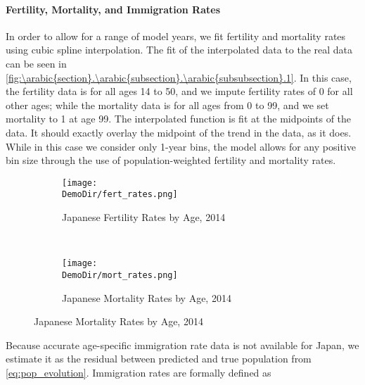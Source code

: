 \documentclass[10pt]{article}
\renewcommand{\thesection}{\arabic{section}}
\renewcommand{\thesubsection}{\thesection.\arabic{subsection}}
\renewcommand{\thesubsubsection}{\thesubsection.\arabic{subsubsection}}
\numberwithin{equation}{subsection}
\newcommand*{\DemoDir}{../../code/Rick/OUTPUT/Demographics}
\begin{document}
\begin{appendices}

\paragraph{Fertility, Mortality, and Immigration Rates}

\par In order to allow for a range of model years, we fit fertility and mortality rates using cubic spline interpolation. The fit of the interpolated data to the real data can be seen in \autoref{fig:\thesubsubsection.1}. In this case, the fertility data is for all ages 14 to 50, and we impute fertility rates of 0 for all other ages; while the mortality data is for all ages from 0 to 99, and we set mortality to 1 at age 99. The interpolated function is fit at the midpoints of the data. It should exactly overlay the midpoint of the trend in the data, as it does. While in this case we consider only 1-year bins, the model allows for any positive bin size through the use of population-weighted fertility and mortality rates.

\begin{figure}[H]
   \caption{\label{fig:\thesubsubsection.1}Fertility and Mortality Rates by Age}
   \begin{subfigure}{0.5\textwidth}
      \centering
      \texttt{[image: \\DemoDir/fert\_rates.png]}
      \caption{Japanese Fertility Rates by Age, 2014}
   \end{subfigure}%
   ~ %
   \begin{subfigure}{0.5\textwidth}
      \centering
      \texttt{[image: \\DemoDir/mort\_rates.png]}
      \caption{Japanese Mortality Rates by Age, 2014}
   \end{subfigure}
\end{figure}

\par Because accurate age-specific immigration rate data is not available for Japan, we estimate it as the residual between predicted and true population from \ref{eq:pop_evolution}. Immigration rates are formally defined as


\end{appendices}
\end{document}
